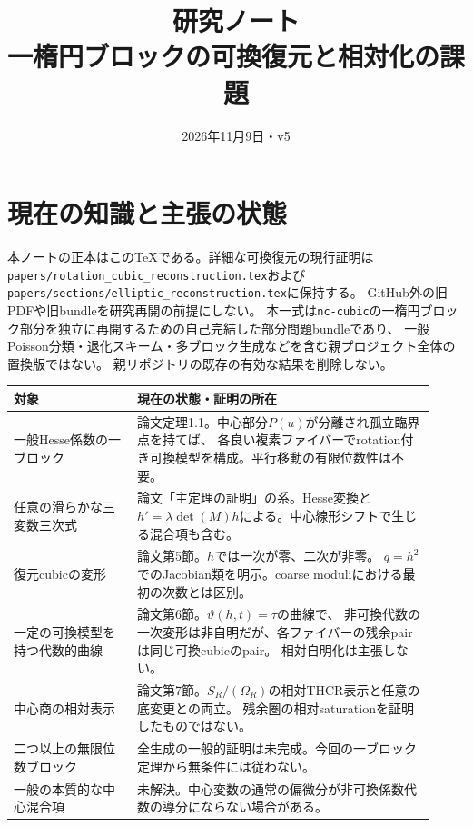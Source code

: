 
\title{研究ノート\\\large 一楕円ブロックの可換復元と相対化の課題}
\author{}
\date{2026年11月9日・v5}

\maketitle

\section{現在の知識と主張の状態}
本ノートの正本はこのTeXである。詳細な可換復元の現行証明は
\texttt{papers/rotation\_cubic\_reconstruction.tex}および
\texttt{papers/sections/elliptic\_reconstruction.tex}に保持する。
GitHub外の旧PDFや旧bundleを研究再開の前提にしない。
本一式は\texttt{nc-cubic}の一楕円ブロック部分を独立に再開するための自己完結した部分問題bundleであり、
一般Poisson分類・退化スキーム・多ブロック生成などを含む親プロジェクト全体の置換版ではない。
親リポジトリの既存の有効な結果を削除しない。

\begin{longtable}{p{0.27\linewidth}p{0.65\linewidth}}
\toprule
対象 & 現在の状態・証明の所在\\\midrule
一般Hesse係数の一ブロック & 論文定理1.1。中心部分$P(u)$が分離され孤立臨界点を持てば、
各良い複素ファイバーでrotation付き可換模型を構成。平行移動の有限位数性は不要。\\
任意の滑らかな三変数三次式 & 論文「主定理の証明」の系。Hesse変換と
$h'=\lambda\det(M)h$による。中心線形シフトで生じる混合項も含む。\\
復元cubicの変形 & 論文第5節。$h$では一次が零、二次が非零。
$q=h^2$でのJacobian類を明示。coarse moduliにおける最初の次数とは区別。\\
一定の可換模型を持つ代数的曲線 & 論文第6節。$\vartheta(h,t)=\tau$の曲線で、
非可換代数の一次変形は非自明だが、各ファイバーの残余pairは同じ可換cubicのpair。
相対自明化は主張しない。\\
中心商の相対表示 & 論文第7節。$S_R/(\Omega_R)$の相対THCR表示と任意の底変更との両立。
残余圏の相対saturationを証明したものではない。\\
二つ以上の無限位数ブロック & 全生成の一般的証明は未完成。今回の一ブロック定理から無条件には従わない。\\
一般の本質的な中心混合項 & 未解決。中心変数の通常の偏微分が非可換係数代数の導分にならない場合がある。\\
\bottomrule
\end{longtable}

